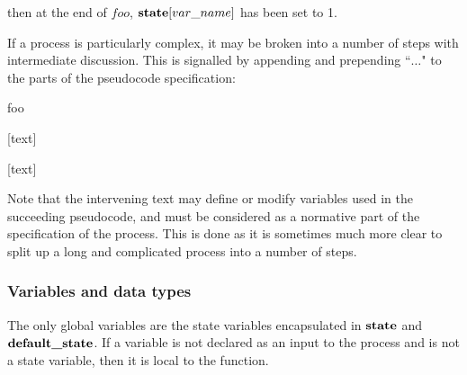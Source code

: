 then at the end of $foo$, $\textbf{state}[var\_name]$ has been set to 1.

If a process is particularly complex, it may be broken into a number of steps with 
intermediate discussion. This is signalled by appending  and prepending ``$\hdots$" to
the parts of the pseudocode specification:

\begin{pseudo}{foo}{}
\bsCODE{\hdots}
\end{pseudo}

[text]

\begin{pseudo*}
\bsCODE{\hdots}
\end{pseudo*}

[text]

\begin{pseudo*}
\end{pseudo*}

Note that the intervening text may define or modify variables used in the succeeding
pseudocode, and must be considered as a normative part of the specification of the process.
This is done as it is sometimes much more clear to split up a long and complicated process
into a number of steps.

\subsubsection{Variables and data types}
\label{datatypes}

The only global variables are the state variables encapsulated in $\textbf{state}$
and $\textbf{default\_state}$. If a variable is not declared as an input to
the process and is not a state variable, then it is local to the function.

